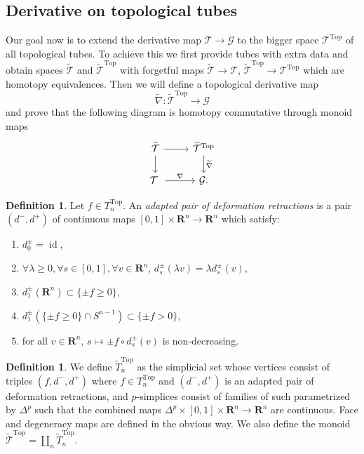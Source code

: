 \documentclass[reqno]{amsart}
\theoremstyle{theorem}
\theoremstyle{remark}
\theoremstyle{definition}
\newtheorem{definition}[corollary]{Definition}
\newcommand{\tnabla}{\widetilde{\nabla}}
\newcommand{\T}{\mathcal{T}}
\newcommand{\bR}{\mathbf{R}}
\newcommand{\R}{\mathbf{R}}
\newcommand{\TT}{\widetilde{\mathcal{T}}}
\newcommand{\GG}{\mathcal{G}}
\newcommand{\TOP}{\mathrm{Top}}
\DeclareMathOperator{\id}{id}
\begin{document}
\subsection{Derivative on topological tubes}


Our goal now is to extend the derivative map $\T \to \GG$ to the bigger space $\T^{\TOP}$
of all topological tubes. To achieve this we first provide tubes with extra data and obtain spaces
$\TT$ and $\TT^{\TOP}$ with forgetful maps $\TT\to \T$, $\TT^{\TOP}\to \T^{\TOP}$ which are
homotopy equivalences. Then we will define a topological derivative map
\[\tnabla :\TT^{\TOP} \to \GG\]
and prove that the following diagram is homotopy commutative through monoid maps
\begin{equation}
\begin{tikzcd}
\TT \arrow[r]\arrow[d]& \TT^{\TOP}\arrow[d,"\tnabla"]\\
\T \arrow[r,"\nabla"] & \GG.
\end{tikzcd}
\end{equation}


\begin{definition}
Let $f\in T_n^{\TOP}$. An \emph{adapted pair of deformation retractions} is a pair $(d^-,d^+)$
of continuous maps $[0,1]\times \R^n\to \R^n$ which satisfy:
\begin{enumerate}
\item $d_0^\pm = \id$,
\item $\forall \lambda \geq 0, \forall s\in[0,1], \forall v\in \R^n$, $d_s^\pm(\lambda v)=\lambda d_s^\pm(v)$,
\item $d_1^\pm(\R^n)\subset \{\pm f \geq 0\}$,
\item $d_1^\pm(\{\pm f\geq 0\}\cap S^{n-1}) \subset \{\pm f >0\}$,
\item for all $v\in \R^n$, $s\mapsto \pm f\circ d_s^\pm(v)$ is non-decreasing.
\end{enumerate}
\end{definition}


\begin{definition}
We define $\widetilde{T}_n^{\TOP}$ as the simplicial set whose vertices consist of triples $(f,d^-,d^+)$ where $f\in T_n^{\TOP}$
and $(d^-,d^+)$ is an adapted pair of deformation retractions, and $p$-simplices consist of families of such parametrized by $\Delta^p$ such that the combined maps $\Delta^p \times [0,1] \times \bR^n \to \bR^n$ are continuous. Face and degeneracy maps are defined in the obvious way. We also define the monoid $\TT^\TOP=\coprod_n\widetilde{T}_n^\TOP$.
\end{definition}
\end{document}
